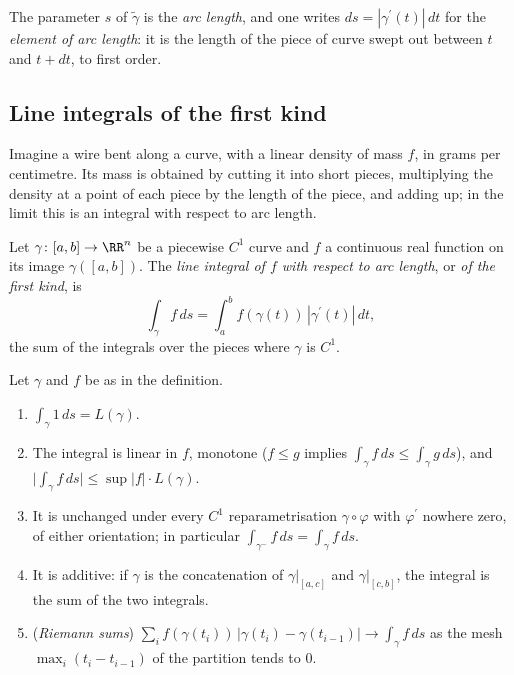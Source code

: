 The parameter $s$ of $\tilde\gamma$ is the \emph{arc length}, and one writes $ds = |\gamma^{\prime}(t)|\,dt$ for the \emph{element of arc length}: it is the length of the piece of curve swept out between $t$ and
$t + dt$, to first order.

\subsection{Line integrals of the first kind}\label{real-analysis:subsection-first-kind}

Imagine a wire bent along a curve, with a linear density of mass $f$, in grams per centimetre. Its mass is obtained by cutting it into short pieces, multiplying the density at a point of each piece by the
length of the piece, and adding up; in the limit this is an integral with respect to arc length.

\begin{definition}\label{real-analysis:definition-first-kind}
Let $\gamma \colon [a, b] \to \RR^n$ be a piecewise $C^1$ curve and $f$ a continuous real function on its image $\gamma([a, b])$. The \emph{line integral of $f$ with respect to arc length}, or \emph{of the
first kind}, is
\[
\int_\gamma f\,ds = \int_a^bf(\gamma(t))\,|\gamma^{\prime}(t)|\,dt,
\]
the sum of the integrals over the pieces where $\gamma$ is $C^1$.
\end{definition}

\begin{proposition}\label{real-analysis:proposition-first-kind}
Let $\gamma$ and $f$ be as in the definition.
\begin{enumerate}
\item $\int_\gamma1\,ds = L(\gamma)$.
\item The integral is linear in $f$, monotone ($f \leq g$ implies $\int_\gamma f\,ds \leq \int_\gamma g\,ds$), and $\bigl|\int_\gamma f\,ds\bigr| \leq \sup|f|\cdot L(\gamma)$.
\item It is unchanged under every $C^1$ reparametrisation $\gamma \circ \varphi$ with $\varphi^{\prime}$ nowhere zero, of either orientation; in particular $\int_{\gamma^-}f\,ds = \int_\gamma f\,ds$.
\item It is additive: if $\gamma$ is the concatenation of $\gamma|_{[a, c]}$ and $\gamma|_{[c, b]}$, the integral is the sum of the two integrals.
\item (\emph{Riemann sums}) $\sum_if(\gamma(t_i))\,|\gamma(t_i) - \gamma(t_{i-1})| \to \int_\gamma f\,ds$ as the mesh $\max_i(t_i - t_{i-1})$ of the partition tends to $0$.
\end{enumerate}
\end{proposition}

